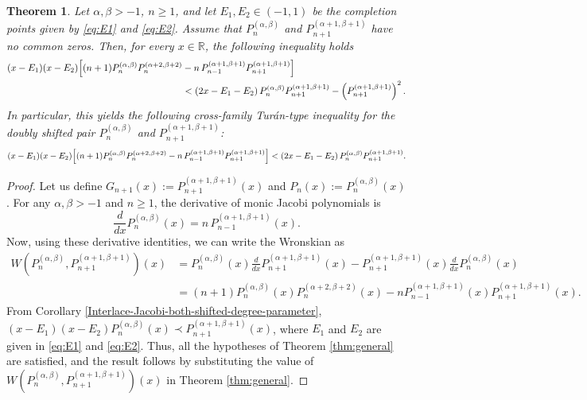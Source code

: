 \documentclass[final,3p,times,12pt]{elsarticle}
\newtheorem{theorem}{Theorem}[section]
\numberwithin{equation}{section}  %
\begin{document}
\begin{theorem}\label{thm:JacobiTuran}
	Let $\alpha,\beta>-1$, $n\ge1$, and let $E_1,E_2\in(-1,1)$
	be the completion points given by \eqref{eq:E1} and \eqref{eq:E2}. Assume that $P_n^{(\alpha,\beta)}$ and $P_{n+1}^{(\alpha+1,\beta+1)}$  have no common zeros. Then, for every $x\in \mathbb{R}$, the following   inequality  holds
		\begin{align}\label{eq:JacobiTuranSharp}
		\nonumber	(x-E_1)(x-E_2)\Bigl[
		(n+1)P_n^{(\alpha,\beta)}P_n^{(\alpha+2,\beta+2)}
		&-n\,P_{n-1}^{(\alpha+1,\beta+1)}P_{n+1}^{(\alpha+1,\beta+1)}
		\Bigr]
		\\&<(2x-E_1-E_2)\,P_n^{(\alpha,\beta)}P_{n+1}^{(\alpha+1,\beta+1)}-\left(P_{n+1}^{(\alpha+1,\beta+1)}\right)^2.
	\end{align}
In particular, this yields the following cross-family Tur\'an-type
	inequality for the doubly shifted pair
	$P_n^{(\alpha,\beta)}$ and
	$P_{n+1}^{(\alpha+1,\beta+1)}$:
	\begin{align}\label{eq:JacobiTuran}
		(x-E_1)(x-E_2)\Bigl[
		(n+1)P_n^{(\alpha,\beta)}P_n^{(\alpha+2,\beta+2)}
		-n\,P_{n-1}^{(\alpha+1,\beta+1)}P_{n+1}^{(\alpha+1,\beta+1)}
		\Bigr]
		<(2x-E_1-E_2)\,P_n^{(\alpha,\beta)}P_{n+1}^{(\alpha+1,\beta+1)}.
	\end{align}
\end{theorem}

\begin{proof}	Let us define  
	$G_{n+1}(x) := {P}_{n+1}^{(\alpha+1,\beta+1)}(x)$
	and $P_{n}(x) := {P}_{n}^{(\alpha,\beta)}(x)$.  
	For any $\alpha,\beta>-1$
	and $n\ge1$, the derivative of monic Jacobi polynomials is 
	\begin{equation}\label{eq0:Jacobider}
		\frac{d}{dx}P_n^{(\alpha,\beta)}(x)
		=n\,P_{n-1}^{(\alpha+1,\beta+1)}(x).
	\end{equation}	
	Now,  using these derivative identities, we can write the Wronskian as
	\begin{align}\label{eq1: Wdoublyshifted}
		\nonumber	W(P^{(\alpha,\beta)}_n,P_{n+1}^{(\alpha+1,\beta+1)})(x)&=P^{(\alpha,\beta)}_{n}(x)\frac{d}{dx}P_{n+1}^{(\alpha+1,\beta+1)}(x)-P^{(\alpha+1,\beta+1)}_{n+1}(x)\frac{d}{dx}P_n^{(\alpha,\beta)}(x)\\
		&=(n+1)P_n^{(\alpha,\beta)}(x)P_n^{(\alpha+2,\beta+2)}(x)
		-nP_{n-1}^{(\alpha+1,\beta+1)}(x)P_{n+1}^{(\alpha+1,\beta+1)}(x).
	\end{align}
	From Corollary \ref{Interlace-Jacobi-both-shifted-degree-parameter},  $(x - E_1)(x - E_2) P^{(\alpha, \beta)}_n(x)\prec P^{(\alpha+1, \beta+1)}_{n+1}(x)$, where $E_1$ and $E_2$ are given in \eqref{eq:E1} and \eqref{eq:E2}. Thus, all the hypotheses of Theorem \ref{thm:general} are satisfied, and the result follows by substituting the value of	$W(P^{(\alpha,\beta)}_n,P_{n+1}^{(\alpha+1,\beta+1)})(x)$ in Theorem \ref{thm:general}.  
\end{proof}
\end{document}
